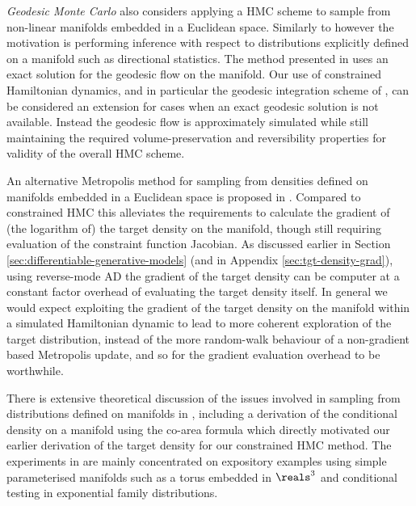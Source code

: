 \emph{Geodesic Monte Carlo} \citep{byrne2013geodesic} also considers applying a \ac{HMC} scheme to sample from non-linear manifolds embedded in a Euclidean space. Similarly to \citep{brubaker2012family} however the motivation is performing inference with respect to distributions explicitly defined on a manifold such as directional statistics. The method presented in \citep{byrne2013geodesic} uses an exact solution for the geodesic flow on the manifold. Our use of constrained Hamiltonian dynamics, and in particular the geodesic integration scheme of \citep{leimkuhler2016efficient}, can be considered an extension for cases when an exact geodesic solution is not available. Instead the geodesic flow is approximately simulated while still maintaining the required volume-preservation and reversibility properties for validity of the overall \ac{HMC} scheme.

An alternative Metropolis method for sampling from densities defined on manifolds embedded in a Euclidean space is proposed in \citep{zappa2017monte}. Compared to constrained \ac{HMC} this alleviates the requirements to calculate the gradient of (the logarithm of) the target density on the manifold, though still requiring evaluation of the constraint function Jacobian. As discussed earlier in Section \ref{sec:differentiable-generative-models} (and in Appendix \ref{sec:tgt-density-grad}), using reverse-mode \ac{AD} the gradient of the target density can be computer at a constant factor overhead of evaluating the target density itself. In general we would expect exploiting the gradient of the target density on the manifold within a simulated Hamiltonian dynamic to lead to more coherent exploration of the target distribution, instead of the more random-walk behaviour of a non-gradient based Metropolis update, and so for the gradient evaluation overhead to be worthwhile.

There is extensive theoretical discussion of the issues involved in sampling from distributions defined on manifolds in \citep{diaconis2013sampling}, including a derivation of the conditional density on a manifold using the co-area formula which directly motivated our earlier derivation of the target density for our constrained \ac{HMC} method. The experiments in \citep{diaconis2013sampling} are mainly concentrated on expository examples using simple parameterised manifolds such as a torus embedded in $\reals^3$ and conditional testing in exponential family distributions. 


